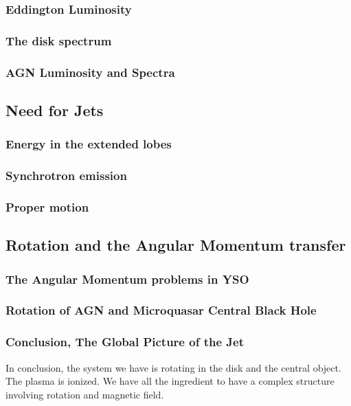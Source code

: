\documentclass[10pt,a4paper]{article}
\begin{document}
\subsubsection{Eddington Luminosity}
\subsubsection{The disk spectrum}
\subsubsection{AGN Luminosity and Spectra}

\subsection{Need for Jets}
\subsubsection{Energy in the extended lobes}
\subsubsection{Synchrotron emission}
\subsubsection{Proper motion}

\subsection{Rotation and the Angular Momentum transfer}
\subsubsection{The Angular Momentum problems in YSO}
\subsubsection{Rotation of AGN and Microquasar Central Black Hole}
\subsubsection{Conclusion, The Global Picture of the Jet}

In conclusion, the system we have is rotating in the disk and the central object. The plasma is ionized. We have all the ingredient to have a complex structure involving rotation and magnetic field.
\end{document}

